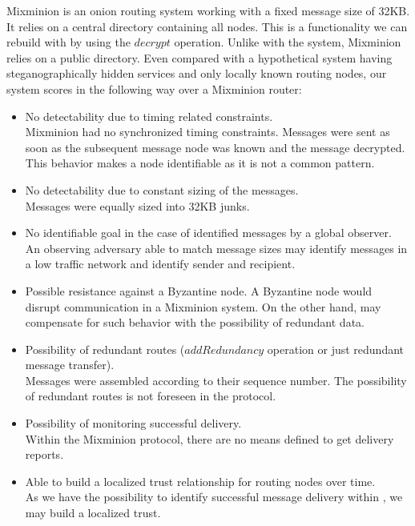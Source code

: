 Mixminion is an onion routing system working with a fixed message size of 32KB. It relies on a central directory containing all nodes. This is a functionality we can rebuild with \MessageVortex{} by using the $decrypt$ operation. Unlike with the \MessageVortex{} system, Mixminion relies on a public directory. Even compared with a hypothetical system having steganographically hidden services and only locally known routing nodes, our system scores in the following way over a Mixminion router:

\begin{itemize}
	\item No detectability due to timing related constraints.\\
	Mixminion had no synchronized timing constraints. Messages were sent as soon as the subsequent message node was known and the message decrypted. This behavior makes a node identifiable as it is not a common pattern.
	\item No detectability due to constant sizing of the messages.\\
	Messages were equally sized into 32KB junks.
	\item No identifiable goal in the case of identified messages by a global observer.\\
	An observing adversary able to match message sizes may identify messages in a low traffic network and identify sender and recipient. 
	\item Possible resistance against a Byzantine node.
	A Byzantine node would disrupt communication in a Mixminion system. On the other hand, \MessageVortex{} may compensate for such behavior with the possibility of redundant data.
	\item Possibility of redundant routes ($addRedundancy$ operation or just redundant message transfer).\\
	Messages were assembled according to their sequence number. The possibility of redundant routes is not foreseen in the protocol.
	\item Possibility of monitoring successful delivery.\\
	Within the Mixminion protocol, there are no means defined to get delivery reports.
	\item Able to build a localized trust relationship for routing nodes over time.\\
	As we have the possibility to identify successful message delivery within \MessageVortex{}, we may build a localized trust.
\end{itemize}

